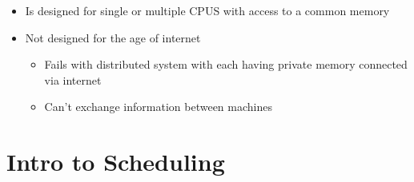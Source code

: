 \documentclass[12pt]{article}
\begin{document}
\begin{itemize}
\begin{itemize}
\begin{itemize}
\begin{itemize}
            \end{itemize}
            \item Is designed for single or multiple CPUS with access to a common
            memory
            \item Not designed for the age of internet
            \begin{itemize}
                \item Fails with distributed system with each having private memory
                connected via internet
                \item Can't exchange information between machines
            \end{itemize}
        \end{itemize}
    \end{itemize}
\end{itemize}

\bigskip

\section{Intro to Scheduling}

\bigskip
\end{document}
